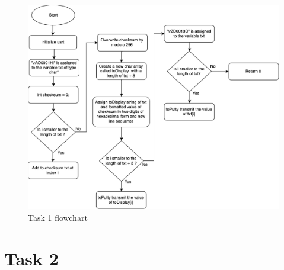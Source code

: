 \documentclass[a4paper,12pt]{article}
\begin{document}
\break
\begin{figure}
\begin{center}
\includegraphics[width=\textwidth/1 ]{flowchart/task1_flowchart.png}
\end{center}
\caption{Task 1 flowchart}
\label{task1}
\end{figure}



\section{Task 2}

\lstset{style=CStyle}
\end{document}

